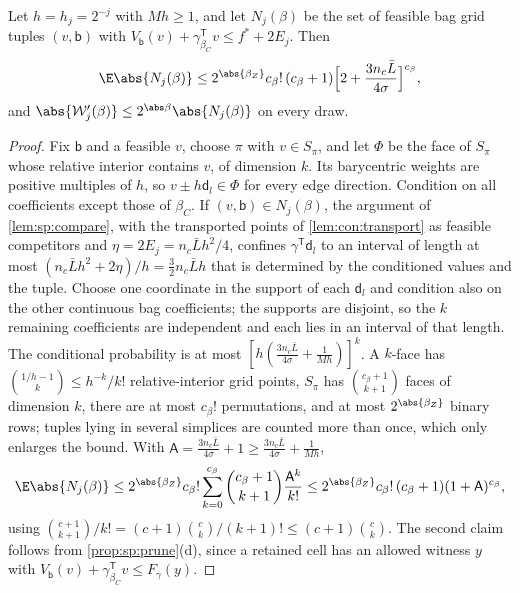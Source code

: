\begin{proposition}\label{prop:con:order-count}
Let $h=h_j=2^{-j}$ with $Mh\ge1$, and let $N_j(\beta)$ be the set of feasible
bag grid tuples $(v,\mathsf b)$ with
$V_{\mathsf b}(v)+\gamma_{\beta_C}^{\mathsf T}v\le f^*+2E_j$. Then
\[
 \E\abs{N_j(\beta)}\le2^{\abs{\beta_Z}}c_\beta!\,(c_\beta+1)
 \Bigl[2+\frac{3n_c\bar L}{4\sigma}\Bigr]^{c_\beta},
\]
and $\abs{\mathcal W'_j(\beta)}\le2^{\abs\beta}\abs{N_j(\beta)}$ on every draw.
\end{proposition}

\begin{proof}
Fix $\mathsf b$ and a feasible $v$, choose $\pi$ with $v\in S_\pi$, and let
$\Phi$ be the face of $S_\pi$ whose relative interior contains $v$, of
dimension $k$. Its barycentric weights are positive multiples of $h$, so
$v\pm h\mathsf d_l\in\Phi$ for every edge direction. Condition on all
coefficients except those of $\beta_C$. If $(v,\mathsf b)\in N_j(\beta)$, the
argument of \cref{lem:sp:compare}, with the transported points of
\cref{lem:con:transport} as feasible competitors and $\eta=2E_j=n_c\bar Lh^2/4$,
confines $\gamma^{\mathsf T}\mathsf d_l$ to an interval of length at most
$(n_c\bar Lh^2+2\eta)/h=\frac32n_c\bar Lh$ that is determined by the
conditioned values and the tuple. Choose one coordinate in the support of
each $\mathsf d_l$ and condition also on the other continuous bag
coefficients; the supports are disjoint, so the $k$ remaining coefficients
are independent and each lies in an interval of that length. The conditional
probability is at most $[h(\frac{3n_c\bar L}{4\sigma}+\frac1{Mh})]^k$. A
$k$-face has $\binom{1/h-1}{k}\le h^{-k}/k!$ relative-interior grid points,
$S_\pi$ has $\binom{c_\beta+1}{k+1}$ faces of dimension $k$, there are at most
$c_\beta!$ permutations, and at most $2^{\abs{\beta_Z}}$ binary rows; tuples
lying in several simplices are counted more than once, which only enlarges
the bound. With $\mathsf A=\frac{3n_c\bar L}{4\sigma}+1\ge\frac{3n_c\bar
L}{4\sigma}+\frac1{Mh}$,
\[
 \E\abs{N_j(\beta)}\le2^{\abs{\beta_Z}}c_\beta!\sum_{k=0}^{c_\beta}
 \binom{c_\beta+1}{k+1}\frac{\mathsf A^k}{k!}
 \le2^{\abs{\beta_Z}}c_\beta!\,(c_\beta+1)(1+\mathsf A)^{c_\beta},
\]
using $\binom{c+1}{k+1}/k!=(c+1)\binom ck/(k+1)!\le(c+1)\binom ck$. The second
claim follows from \cref{prop:sp:prune}(d), since a retained cell has an
allowed witness $y$ with $V_{\mathsf b}(v)+\gamma_{\beta_C}^{\mathsf T}v\le
F_\gamma(y)$.
\end{proof}

